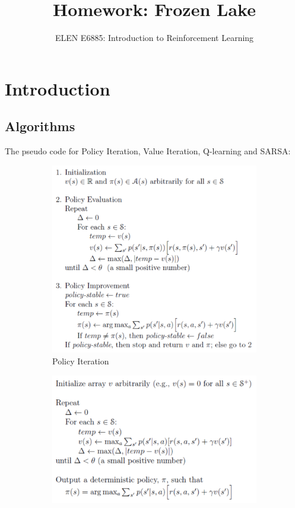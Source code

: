 \documentclass[letterpaper,12pt]{article}
\begin{document}
\title{Homework: Frozen Lake}
\author{ELEN E6885: Introduction to Reinforcement Learning}
\date{}
\maketitle




\section{Introduction}

\subsection{Algorithms}
The pseudo code for Policy Iteration, Value Iteration, Q-learning and SARSA:
\begin{figure}[h!]
     \centering
     \begin{subfigure}[b]{0.475\textwidth}
         \centering
         \includegraphics[width=\textwidth]{PI.png}
         \caption{Policy Iteration}
         \label{fig:1}
     \end{subfigure}
     \hfill
     \begin{subfigure}[b]{0.475\textwidth}
         \centering
         \includegraphics[width=\textwidth]{VI.png}

\end{subfigure}
\end{figure}
\end{document}
